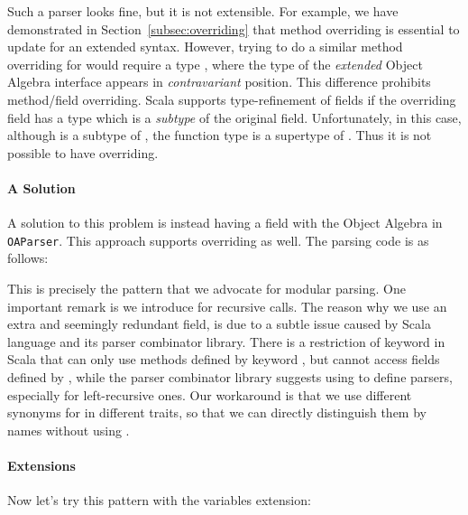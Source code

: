Such a parser looks fine, but it is not extensible. For example, we have demonstrated in Section~\ref{subsec:overriding} that method overriding is essential to update  for an extended syntax. However, trying to do a similar method overriding for  would require a type  , where the type of the \emph{extended} Object Algebra interface appears in \emph{contravariant} position. This difference prohibits method/field overriding. Scala supports type-refinement of fields if the overriding
field has a type which is a \emph{subtype} of the original field.
Unfortunately, in this case, although  is a subtype
of , the function type   is a supertype of  . Thus it is not possible to have overriding.


\paragraph{A Solution}
A solution to this problem is instead having a field with the Object Algebra
in \lstinline{OAParser}. This approach supports overriding as well.
The parsing code is as follows:

This is precisely the pattern that we advocate for modular parsing.
One important remark is we introduce  for recursive calls.
The reason why we use an extra and seemingly redundant field, is due to a subtle issue caused by Scala language and its parser combinator library. There is a restriction of  keyword in Scala that  can only use methods defined by keyword , but cannot access fields defined by , while the parser combinator library suggests using  to define parsers, especially for left-recursive ones. Our workaround is that we use different synonyms for  in different traits, so that we can directly distinguish them by names without using .

\paragraph{Extensions}
Now let's try this pattern with the variables extension:

